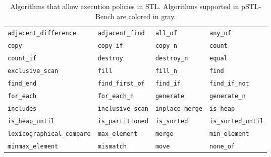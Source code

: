 \begin{table*}[t]
	\caption{Algorithms that allow execution policies in STL. Algorithms supported in pSTL-Bench are colored in gray.}
	\label{tab:available_benchmarks}
	\centering
	\small
	\begin{tabular}{l l l l}
		\toprule
		\cellcolor{gray!15}\verb|adjacent_difference|      & \cellcolor{gray!15}\verb|adjacent_find|    & \cellcolor{gray!15}\verb|all_of|         & \cellcolor{gray!15}\verb|any_of|                   \\
		\cellcolor{gray!15}\verb|copy|                     & \cellcolor{gray!15}\verb|copy_if|          & \cellcolor{gray!15}\verb|copy_n|         & \cellcolor{gray!15}\verb|count|                    \\
		\cellcolor{gray!15}\verb|count_if|                 & \verb|destroy|                             & \verb|destroy_n|                         & \cellcolor{gray!15}\verb|equal|                    \\
		\cellcolor{gray!15}\verb|exclusive_scan|           & \cellcolor{gray!15}\verb|fill|             & \verb|fill_n|                            & \cellcolor{gray!15}\verb|find|                     \\
		\verb|find_end|                                    & \verb|find_first_of|                       & \verb|find_if|                           & \verb|find_if_not|                                 \\
		\cellcolor{gray!15}\verb|for_each|                 & \verb|for_each_n|                          & \cellcolor{gray!15}\verb|generate|       & \verb|generate_n|                                  \\
		\cellcolor{gray!15}\verb|includes|                 & \cellcolor{gray!15}\verb|inclusive_scan|   & \cellcolor{gray!15}\verb|inplace_merge|  & \verb|is_heap|                                     \\
		\verb|is_heap_until|                               & \verb|is_partitioned|                      & \cellcolor{gray!15}\verb|is_sorted|      & \verb|is_sorted_until|                             \\
		\cellcolor{gray!15}\verb|lexicographical_compare|  & \cellcolor{gray!15}\verb|max_element|      & \cellcolor{gray!15}\verb|merge|          & \cellcolor{gray!15}\verb|min_element|              \\
		\verb|minmax_element|                              & \cellcolor{gray!15}\verb|mismatch|         & \verb|move|                              & \cellcolor{gray!15}\verb|none_of|                  \\

\end{tabular}
\end{table*}
